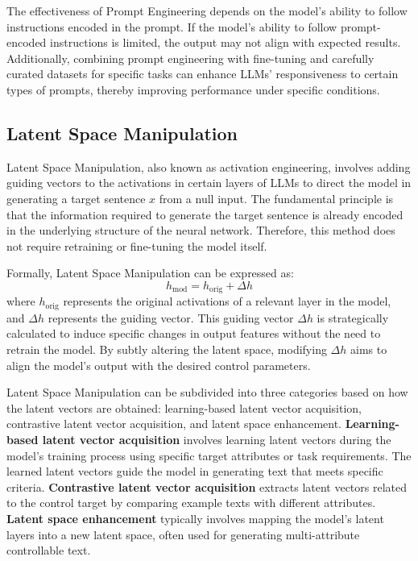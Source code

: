 \documentclass[acmsmall, screen]{acmart}
\begin{document}
The effectiveness of Prompt Engineering depends on the model's ability to follow instructions encoded in the prompt. If the model's ability to follow prompt-encoded instructions is limited, the output may not align with expected results. Additionally, combining prompt engineering with fine-tuning and carefully curated datasets for specific tasks can enhance LLMs' responsiveness to certain types of prompts, thereby improving performance under specific conditions.

\subsection{Latent Space Manipulation}

Latent Space Manipulation, also known as activation engineering, involves adding guiding vectors to the activations in certain layers of LLMs to direct the model in generating a target sentence \( x \) from a null input. The fundamental principle is that the information required to generate the target sentence is already encoded in the underlying structure of the neural network. Therefore, this method does not require retraining or fine-tuning the model itself.

Formally, Latent Space Manipulation can be expressed as:
\begin{equation}
h_{\text{mod}} = h_{\text{orig}} + \Delta h
\end{equation}
where \( h_{\text{orig}} \) represents the original activations of a relevant layer in the model, and \( \Delta h \) represents the guiding vector. This guiding vector \( \Delta h \) is strategically calculated to induce specific changes in output features without the need to retrain the model. By subtly altering the latent space, modifying \( \Delta h \) aims to align the model's output with the desired control parameters.

Latent Space Manipulation can be subdivided into three categories based on how the latent vectors are obtained: learning-based latent vector acquisition, contrastive latent vector acquisition, and latent space enhancement. \textbf{Learning-based latent vector acquisition} involves learning latent vectors during the model's training process using specific target attributes or task requirements. The learned latent vectors guide the model in generating text that meets specific criteria. \textbf{Contrastive latent vector acquisition} extracts latent vectors related to the control target by comparing example texts with different attributes. \textbf{Latent space enhancement} typically involves mapping the model's latent layers into a new latent space, often used for generating multi-attribute controllable text.
\end{document}
